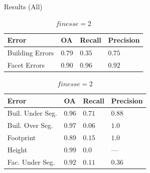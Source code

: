 \documentclass{beamer}
\begin{document}
            \begin{frame}[plain]{Results (All)}
                \begin{table}
                    \begin{subtable}{.4\textwidth}
                        \tiny
                        \begin{center}
                            \begin{tabular}{x{1cm} x{.5cm} x{.5cm} x{.5cm}}
                                \toprule
                                {\bf Error} & {\bf OA} & {\bf Recall} & {\bf Precision} \\
                                \midrule
                                Building Errors & $0.79$ & $0.35$ & $0.75$ \\
                                \midrule
                                Facet Errors & $0.90$ & $0.96$ & $0.92$ \\
                                \bottomrule
                            \end{tabular}
                            \caption{\tiny\label{tab::finesse2} $finesse = 2$}
                        \end{center}
                    \end{subtable}
                    \begin{subtable}{.45\textwidth}
                        \tiny
                        \begin{center}
                            \begin{tabular}{x{1.75cm} x{.5cm} x{.5cm} x{.5cm}}
                                \toprule
                                {\bf Error} & {\bf OA} & {\bf Recall} & {\bf Precision} \\
                                \midrule
                                Buil. Under Seg. & $0.96$ & $0.71$ & $0.88$ \\
                                \midrule
                                Buil. Over Seg. & $0.97$ & $0.06$ & $1.0$ \\
                                \midrule
                                Footprint & $0.89$ & $0.15$ & $1.0$ \\
                                \midrule
                                Height & $0.99$ & $0.0$ & --- \\
                                \midrule
                                \midrule
                                Fac. Under Seg. & $0.92$ & $0.11$ & $0.36$ \\

\end{tabular}
\end{center}
\end{subtable}
\end{table}
\end{frame}
\end{document}
